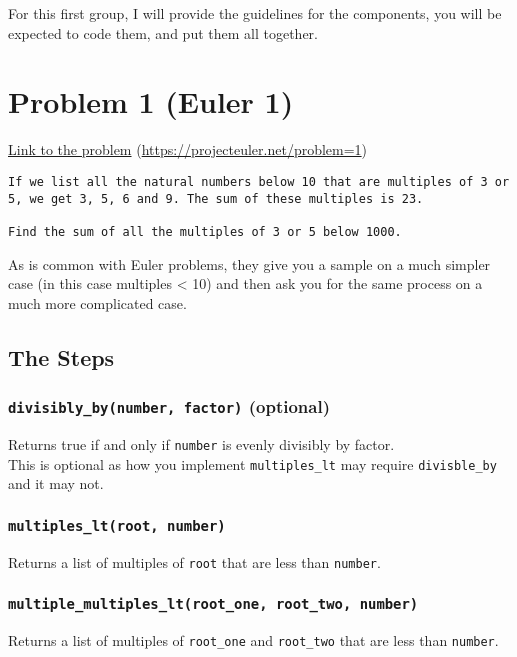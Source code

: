 \documentclass[11pt]{article}
\begin{document}
For this first group, I will provide the guidelines for the components, you will be expected to code them, and put them all together.\\
\section{Problem 1 (Euler 1)}
\label{sec:orge601162}
\href{https://projecteuler.net/problem=1}{Link to the problem} (\url{https://projecteuler.net/problem=1})\\

\begin{verbatim}
If we list all the natural numbers below 10 that are multiples of 3 or 5, we get 3, 5, 6 and 9. The sum of these multiples is 23.

Find the sum of all the multiples of 3 or 5 below 1000.
\end{verbatim}

As is common with Euler problems, they give you a sample on a much simpler case (in this case multiples < 10) and then ask you for the same process on a much more complicated case.\\

\subsection{The Steps}
\label{sec:orgaf7e253}
\subsubsection{\texttt{divisibly\_by(number, factor)} (optional)}
\label{sec:org2ca1272}
Returns true if and only if \texttt{number} is evenly divisibly by factor.\\

This is optional as how you implement \texttt{multiples\_lt} may require \texttt{divisble\_by} and it may not.\\
\subsubsection{\texttt{multiples\_lt(root, number)}}
\label{sec:org5ce404a}
Returns a list of multiples of \texttt{root} that are less than \texttt{number}.\\
\subsubsection{\texttt{multiple\_multiples\_lt(root\_one, root\_two, number)}}
\label{sec:org7c0636b}
Returns a list of multiples of \texttt{root\_one} and \texttt{root\_two} that are less than \texttt{number}.\\
\end{document}
